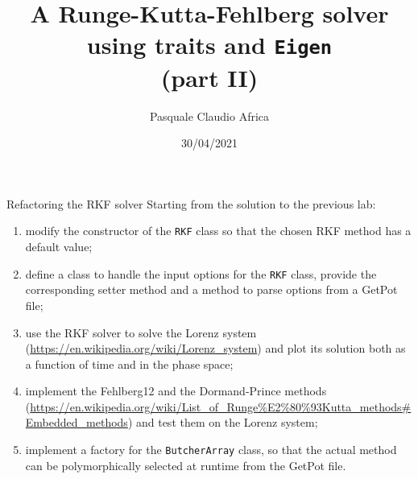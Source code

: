 \documentclass[10pt]{beamer}
\begin{document}
    \title{A Runge-Kutta-Fehlberg solver\protect\\using traits and \texttt{Eigen}\protect\\(part II)}
    \author{Pasquale Claudio Africa}
    \date{30/04/2021}

\begin{frame}
    \maketitle
\end{frame}

\begin{frame}{Refactoring the RKF solver}
Starting from the solution to the previous lab:
\begin{enumerate}
\item modify the constructor of the \texttt{RKF} class so that the chosen RKF method has a default value;
\item define a class to handle the input options for the \texttt{RKF} class, provide the corresponding setter method and a method to parse options from a GetPot file;
\item use the RKF solver to solve the Lorenz system (\url{https://en.wikipedia.org/wiki/Lorenz_system}) and plot its solution both as a function of time and in the phase space;
\item implement the Fehlberg12 and the Dormand-Prince methods (\url{https://en.wikipedia.org/wiki/List_of_Runge\%E2\%80\%93Kutta_methods\#Embedded_methods}) and test them on the Lorenz system;
\item implement a factory for the \texttt{ButcherArray} class, so that the actual method can be polymorphically selected at runtime from the GetPot file.
\end{enumerate}
\end{frame}
\end{document}
